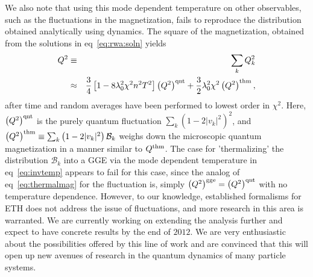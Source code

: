 \documentclass[a4paper,10pt]{report}
\begin{document}
We also note that using this mode dependent temperature on other observables, such as the fluctuations in the magnetization, fails to reproduce the distribution obtained analytically using dynamics. The square of the magnetization, obtained from the solutions in eq\ \ref{eq:rwa:soln} yields
\begin{eqnarray}
Q^2&\equiv&\sum_k Q^2_k \nonumber \\
    &\approx&\frac{3}{4}\left[1-8\lambda^2_0\chi^2n^2T^2\right]\left(Q^2\right)^{\rm qnt}+\frac{3}{2}\lambda^2_0\chi^2 \left(Q^2\right)^{\rm thm},
\end{eqnarray}
after time and random averages have been performed to lowest order in $\chi^2$. Here,  $\left(Q^2\right)^{\rm qnt}$ is the purely quantum fluctuation $\sum_k \left(1-2|v_k|^2\right)^2$, and $\left(Q^2\right)^{\rm thm}\equiv\sum_k\left(1-2|v_k|^2\right)\mathcal{B}_k$ weighs down the microscopic quantum magnetization in a manner similar to $Q^{\rm thm}$. The case for 'thermalizing' the distribution $\mathcal{B}_k$ into a GGE via the mode dependent temperature in eq\ \ref{eq:invtemp} appears to fail for this case, since the analog of eq\ \ref{eq:thermalmag} for the fluctuation is, simply $\left(Q^2\right)^{\rm gge}=\left(Q^2\right)^{\rm qnt}$ with no temperature dependence. However, to our knowledge, established formalisms for ETH does not address the issue of fluctuations, and more research in this area is warranted. We are currently working on extending the analysis further and expect to have concrete results by the end of $2012$. We are very enthusiastic about the possibilities offered by this line of work 
and are convinced that this will open up new avenues of research in the quantum dynamics of many particle systems.
\end{document}
